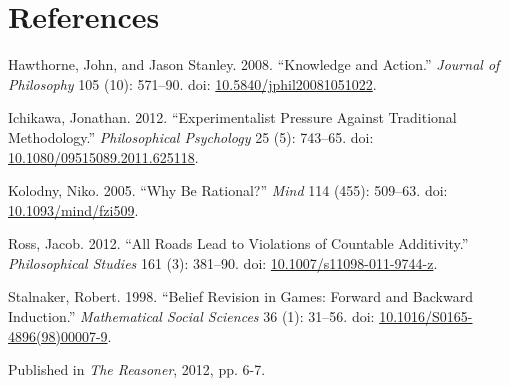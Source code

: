 \documentclass[
  11pt,
  letterpaper,
  DIV=11,
  numbers=noendperiod,
  twoside]{scrartcl}
\newlength{\cslhangindent}
\newenvironment{CSLReferences}[2] %
 {\begin{list}{}{%
  \setlength{\itemindent}{0pt}
  \setlength{\leftmargin}{0pt}
  \setlength{\parsep}{0pt}
  \ifodd #1
   \setlength{\leftmargin}{\cslhangindent}
   \setlength{\itemindent}{-1\cslhangindent}
  \fi
  \setlength{\itemsep}{#2\baselineskip}}}
 {\end{list}}
\begin{document}
\section*{References}\label{references}

\label{refs}
\begin{CSLReferences}{1}{0}
Hawthorne, John, and Jason Stanley. 2008. {``{Knowledge and Action}.''}
\emph{Journal of Philosophy} 105 (10): 571--90. doi:
\href{https://doi.org/10.5840/jphil20081051022}{10.5840/jphil20081051022}.

Ichikawa, Jonathan. 2012. {``Experimentalist Pressure Against
Traditional Methodology.''} \emph{Philosophical Psychology} 25 (5):
743--65. doi:
\href{https://doi.org/10.1080/09515089.2011.625118}{10.1080/09515089.2011.625118}.

Kolodny, Niko. 2005. {``Why Be Rational?''} \emph{Mind} 114 (455):
509--63. doi:
\href{https://doi.org/10.1093/mind/fzi509}{10.1093/mind/fzi509}.

Ross, Jacob. 2012. {``All Roads Lead to Violations of Countable
Additivity.''} \emph{Philosophical Studies} 161 (3): 381--90. doi:
\href{https://doi.org/10.1007/s11098-011-9744-z}{10.1007/s11098-011-9744-z}.

Stalnaker, Robert. 1998. {``Belief Revision in Games: Forward and
Backward Induction.''} \emph{Mathematical Social Sciences} 36 (1):
31--56. doi:
\href{https://doi.org/10.1016/S0165-4896(98)00007-9}{10.1016/S0165-4896(98)00007-9}.

\end{CSLReferences}



\noindent Published in\emph{
The Reasoner}, 2012, pp. 6-7.
\end{document}

